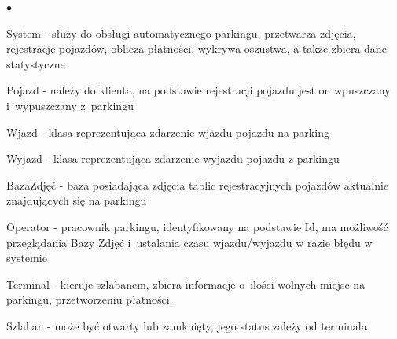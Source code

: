 \begin{list}{$\bullet$}{}
\item System - służy do obsługi automatycznego parkingu, przetwarza zdjęcia, rejestracje pojazdów, oblicza płatności, wykrywa oszustwa, a także zbiera dane statystyczne
\item Pojazd - należy do klienta, na podstawie rejestracji pojazdu jest on wpuszczany i~wypuszczany z~parkingu
\item Wjazd - klasa reprezentująca zdarzenie wjazdu pojazdu na parking
\item Wyjazd - klasa reprezentująca zdarzenie wyjazdu pojazdu z parkingu
\item BazaZdjęć - baza posiadająca zdjęcia tablic rejestracyjnych pojazdów aktualnie znajdujących się na parkingu
\item Operator - pracownik parkingu, identyfikowany na podstawie Id, ma możliwość przeglądania Bazy Zdjęć i~ustalania czasu wjazdu/wyjazdu w razie błędu w systemie
\item Terminal - kieruje szlabanem, zbiera informacje o~ilości wolnych miejsc na parkingu, przetworzeniu płatności.
\item Szlaban - może być otwarty lub zamknięty, jego status zależy od terminala
\end{list}
